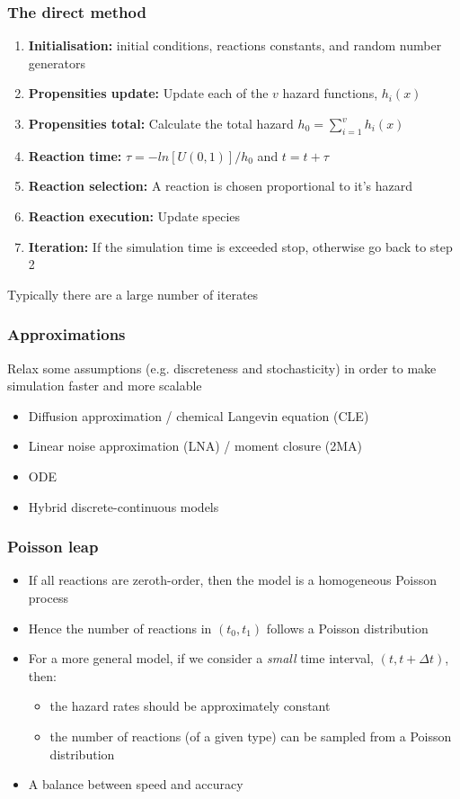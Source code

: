 \documentclass[t,compress]{beamer}
\begin{document}
\begin{frame}
\frametitle{The direct method}

\begin{enumerate}
\item \textbf{Initialisation:} initial conditions, reactions constants, and random number generators
\item \textbf{\alert<2>{Propensities update:}} Update each of the $v$ hazard functions, $h_i(x)$
\item \textbf{Propensities total:} Calculate the total hazard $h_0 = \sum_{i=1}^v h_i(x)$
\item \textbf{\alert<3>{Reaction time:}} $\tau = -ln[U(0,1)]/h_0$ and $t = t+ \tau$
\item \textbf{\alert<4>{Reaction selection:}} A reaction is chosen proportional to it's
  hazard
\item \textbf{Reaction execution:} Update species
\item \textbf{Iteration:} If the simulation time is exceeded stop, otherwise go back to step 2
\end{enumerate}
\alert<2->{Typically there are a large number of iterates}
\end{frame}


\begin{frame}
  \frametitle{Approximations} 

Relax some assumptions (e.g. discreteness  and stochasticity) in order to make simulation faster and more scalable
\begin{itemize}
\item Diffusion approximation / chemical Langevin equation (CLE)
\item Linear noise approximation (LNA) / moment closure (2MA)
\item ODE
\item Hybrid discrete-continuous models
\end{itemize}
\end{frame}

\begin{frame}
\frametitle{Poisson leap}
\begin{itemize}
\item If all reactions are zeroth-order, then the model is a homogeneous Poisson process
\item Hence the number of reactions in $(t_0, t_1)$ follows a Poisson distribution
\item For a more general model, if we consider a \textit{small} time interval,
  $(t, t+ \Delta t)$, then:
\begin{itemize}
\item the hazard rates should be approximately constant
\item the number of reactions (of a given type) can be sampled from a Poisson
  distribution
\end{itemize}
\item A balance between speed and accuracy
\end{itemize}
\end{frame}
\end{document}
